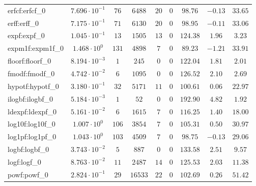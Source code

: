 \begin{tabular}{|l|c|c|c|c|c|c|c|c|}
erfcf:erfcf\_0               & $ 7.696 \cdot 10^{-1} $ & $ 76     $ & $ 6488   $ & $ 20  $ & $ 0   $ & $ 98.76       $ & $ -0.13   $ & $ 33.65   $ \\
erff:erff\_0                 & $ 7.175 \cdot 10^{-1} $ & $ 71     $ & $ 6130   $ & $ 20  $ & $ 0   $ & $ 98.95       $ & $ -0.11   $ & $ 33.06   $ \\
expf:expf\_0                 & $ 1.045 \cdot 10^{-1} $ & $ 13     $ & $ 1505   $ & $ 13  $ & $ 0   $ & $ 124.38      $ & $ 1.96    $ & $ 3.23    $ \\
expm1f:expm1f\_0             & $ 1.468 \cdot 10^{0}  $ & $ 131    $ & $ 4898   $ & $ 7   $ & $ 0   $ & $ 89.23       $ & $ -1.21   $ & $ 33.91   $ \\
floorf:floorf\_0             & $ 8.194 \cdot 10^{-3} $ & $ 1      $ & $ 245    $ & $ 0   $ & $ 0   $ & $ 122.04      $ & $ 1.81    $ & $ 2.01    $ \\
fmodf:fmodf\_0               & $ 4.742 \cdot 10^{-2} $ & $ 6      $ & $ 1095   $ & $ 0   $ & $ 0   $ & $ 126.52      $ & $ 2.10    $ & $ 2.69    $ \\
hypotf:hypotf\_0             & $ 3.180 \cdot 10^{-1} $ & $ 32     $ & $ 5171   $ & $ 11  $ & $ 0   $ & $ 100.61      $ & $ 0.06    $ & $ 22.97   $ \\
ilogbf:ilogbf\_0             & $ 5.184 \cdot 10^{-3} $ & $ 1      $ & $ 52     $ & $ 0   $ & $ 0   $ & $ 192.90      $ & $ 4.82    $ & $ 1.92    $ \\
ldexpf:ldexpf\_0             & $ 5.161 \cdot 10^{-2} $ & $ 6      $ & $ 1615   $ & $ 7   $ & $ 0   $ & $ 116.25      $ & $ 1.40    $ & $ 18.00   $ \\
log10f:log10f\_0             & $ 1.007 \cdot 10^{0}  $ & $ 106    $ & $ 3854   $ & $ 7   $ & $ 0   $ & $ 105.31      $ & $ 0.50    $ & $ 30.97   $ \\
log1pf:log1pf\_0             & $ 1.043 \cdot 10^{0}  $ & $ 103    $ & $ 4509   $ & $ 7   $ & $ 0   $ & $ 98.75       $ & $ -0.13   $ & $ 29.06   $ \\
logbf:logbf\_0               & $ 3.743 \cdot 10^{-2} $ & $ 5      $ & $ 887    $ & $ 0   $ & $ 0   $ & $ 133.58      $ & $ 2.51    $ & $ 9.57    $ \\
logf:logf\_0                 & $ 8.763 \cdot 10^{-2} $ & $ 11     $ & $ 2487   $ & $ 14  $ & $ 0   $ & $ 125.53      $ & $ 2.03    $ & $ 11.38   $ \\
powf:powf\_0                 & $ 2.824 \cdot 10^{-1} $ & $ 29     $ & $ 16533  $ & $ 22  $ & $ 0   $ & $ 102.69      $ & $ 0.26    $ & $ 51.42   $ \\

\end{tabular}
